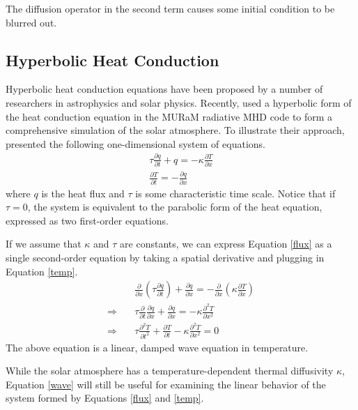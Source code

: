 \documentclass[iop]{emulateapj}
\begin{document}
			The diffusion operator in the second term causes some initial condition to be blurred out.
		
		\subsection{Hyperbolic Heat Conduction}
		
			Hyperbolic heat conduction equations have been proposed by a number of researchers in astrophysics and solar physics.
				Recently, \cite{A} used a hyperbolic form of the heat conduction equation in the MURaM radiative \ac{MHD} code to form a comprehensive simulation of the solar atmosphere.
				To illustrate their approach, \cite{A} presented the following one-dimensional system of equations.
				\begin{gather}
					\tau \frac{\partial q}{\partial t} + q = -\kappa \frac{\partial T}{\partial x} \label{flux}\\
					\frac{\partial T}{\partial t} = -\frac{\partial q}{\partial x} \label{temp}
				\end{gather}
				where $q$ is the heat flux and $\tau$ is some characteristic time scale. 
				Notice that if $\tau = 0$, the system is equivalent to the parabolic form of the heat equation, expressed as two first-order equations.
				
				If we assume that $\kappa$ and $\tau$ are constants, we can express Equation \ref{flux} as a single second-order equation by taking a spatial derivative and plugging in Equation \ref{temp}.
				\begin{align}
					& \frac{\partial}{\partial x} \left( \tau \frac{\partial q}{\partial t} \right) + \frac{\partial q}{\partial x} = - \frac{\partial}{\partial x} \left( \kappa \frac{\partial T}{\partial x} \right) \\
					\Rightarrow \quad & \tau \frac{\partial}{\partial t} \frac{\partial q}{\partial x} + \frac{\partial q}{\partial x} = -\kappa \frac{\partial^2 T}{\partial x^2} \\
					\Rightarrow \quad & \tau \frac{\partial^2 T}{\partial t^2} +  \frac{\partial T}{\partial t} - \kappa \frac{\partial^2 T}{\partial x^2} = 0 \label{wave}
				\end{align}
				The above equation is a linear, damped wave equation in temperature. 
				
				While the solar atmosphere has a temperature-dependent thermal diffusivity $\kappa$, Equation \ref{wave} will still be useful for examining the linear behavior of the system formed by Equations \ref{flux} and \ref{temp}.
		
\end{document}
